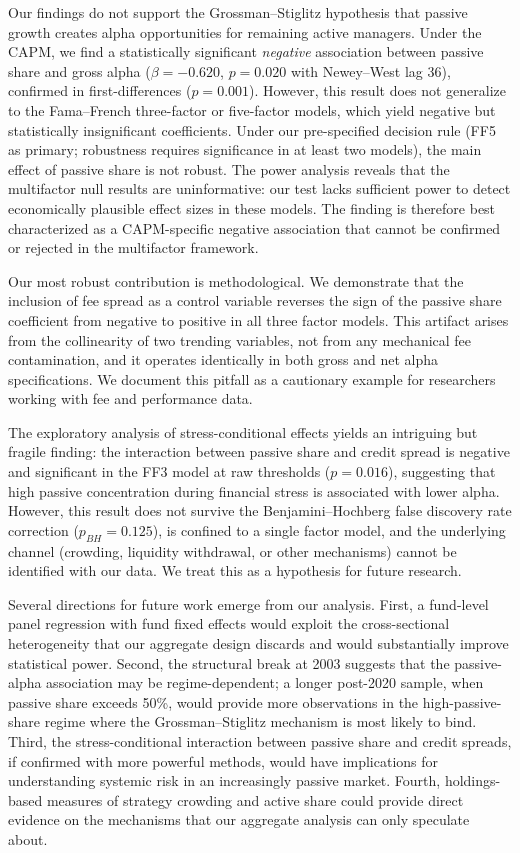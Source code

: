 \documentclass[11pt, a4paper]{article}
\begin{document}
Our findings do not support the Grossman--Stiglitz hypothesis that passive growth creates alpha opportunities for remaining active managers. Under the CAPM, we find a statistically significant \textit{negative} association between passive share and gross alpha ($\beta = -0.620$, $p = 0.020$ with Newey--West lag 36), confirmed in first-differences ($p = 0.001$). However, this result does not generalize to the Fama--French three-factor or five-factor models, which yield negative but statistically insignificant coefficients. Under our pre-specified decision rule (FF5 as primary; robustness requires significance in at least two models), the main effect of passive share is not robust. The power analysis reveals that the multifactor null results are uninformative: our test lacks sufficient power to detect economically plausible effect sizes in these models. The finding is therefore best characterized as a CAPM-specific negative association that cannot be confirmed or rejected in the multifactor framework.

Our most robust contribution is methodological. We demonstrate that the inclusion of fee spread as a control variable reverses the sign of the passive share coefficient from negative to positive in all three factor models. This artifact arises from the collinearity of two trending variables, not from any mechanical fee contamination, and it operates identically in both gross and net alpha specifications. We document this pitfall as a cautionary example for researchers working with fee and performance data.

The exploratory analysis of stress-conditional effects yields an intriguing but fragile finding: the interaction between passive share and credit spread is negative and significant in the FF3 model at raw thresholds ($p = 0.016$), suggesting that high passive concentration during financial stress is associated with lower alpha. However, this result does not survive the Benjamini--Hochberg false discovery rate correction ($p_{BH} = 0.125$), is confined to a single factor model, and the underlying channel (crowding, liquidity withdrawal, or other mechanisms) cannot be identified with our data. We treat this as a hypothesis for future research.

Several directions for future work emerge from our analysis. First, a fund-level panel regression with fund fixed effects would exploit the cross-sectional heterogeneity that our aggregate design discards and would substantially improve statistical power. Second, the structural break at 2003 suggests that the passive-alpha association may be regime-dependent; a longer post-2020 sample, when passive share exceeds 50\%, would provide more observations in the high-passive-share regime where the Grossman--Stiglitz mechanism is most likely to bind. Third, the stress-conditional interaction between passive share and credit spreads, if confirmed with more powerful methods, would have implications for understanding systemic risk in an increasingly passive market. Fourth, holdings-based measures of strategy crowding and active share could provide direct evidence on the mechanisms that our aggregate analysis can only speculate about.
\end{document}
